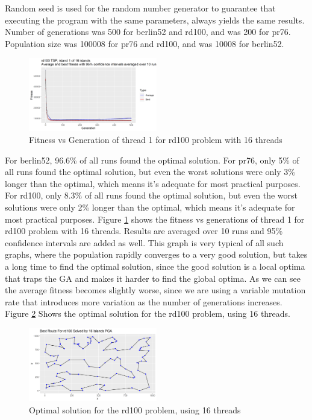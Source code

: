 \documentclass[10pt,journal,compsoc]{IEEEtran}
\begin{document}
Random seed is used for the random number generator to guarantee that executing the program with the same parameters, always yields the same results. Number of generations was 500 for berlin52 and rd100, and was 200 for pr76. Population size was 100008 for pr76 and rd100, and was 10008 for berlin52.\\
\begin{figure}
    \centering
    \includegraphics[width=0.5\textwidth]{png/04.png}
    \caption{Fitness vs Generation of thread 1 for rd100 problem with 16 threads}
    \label{fig:4}
\end{figure}
For berlin52, 96.6\% of all runs found the optimal solution. For pr76, only 5\% of all runs found the optimal solution, but even the worst solutions were only 3\% longer than the optimal, which means it’s adequate for most practical purposes. For rd100, only 8.3\% of all runs found the optimal solution, but even the worst solutions were only 2\% longer than the optimal, which means it’s adequate for most practical purposes. Figure \ref{fig:4} shows the fitness vs generations of thread 1 for rd100 problem with 16 threads. Results are averaged over 10 runs and 95\% confidence intervals are added as well. This graph is very typical of all such graphs, where the population rapidly converges to a very good solution, but takes a long time to find the optimal solution, since the good solution is a local optima that traps the GA and makes it harder to find the global optima. As we can see the average fitness becomes slightly worse, since we are using a variable mutation rate that introduces more variation as the number of generations increases.\\
Figure \ref{fig:5} Shows the optimal solution  for the rd100 problem, using 16 threads.
\begin{figure}
    \centering
    \includegraphics[width=0.5\textwidth]{png/05.png}
    \caption{Optimal solution  for the rd100 problem, using 16 threads}
    \label{fig:5}
\end{figure}
\end{document}
